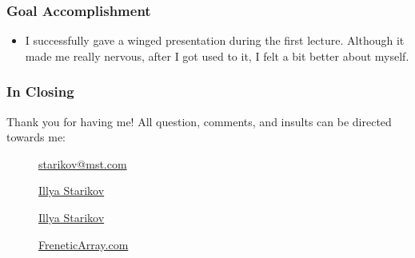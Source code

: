 \documentclass[handout,xclolor=dvipsnames]{beamer}    %
\begin{document}
\begin{darkframes}
    \begin{frame}
        \frametitle{Goal Accomplishment}

        \begin{itemize}
            \item I successfully gave a winged presentation during the first lecture. Although it made me really nervous, after I got used to it, I felt a bit better about myself.
        \end{itemize}
    \end{frame}

    \begin{frame}
        \frametitle{In Closing}

        Thank you for having me! All question, comments, and insults can be directed towards me:

        \begin{center}
            \begin{description}
                \item[\faComment] \href{mailto:starikov@mst.edu}{starikov@mst.com}
                \item[\faLinkedin] \href{https://www.linkedin.com/in/illyastarikov/}{Illya Starikov}
                \item[\faGithub] \href{https://github.com/IllyaStarikov/}{Illya Starikov}
                \item[\faRss] \href{https://freneticarray.com/}{FreneticArray.com}
            \end{description}
        \end{center}
    \end{frame}
\end{darkframes}
\end{document}
